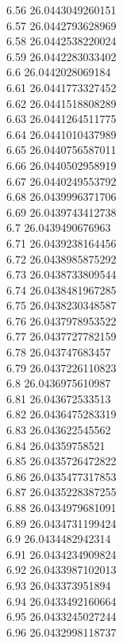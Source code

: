 {6.56	26.0443049260151\\
6.57	26.0442793628969\\
6.58	26.0442538220024\\
6.59	26.0442283033402\\
6.6	26.0442028069184\\
6.61	26.0441773327452\\
6.62	26.0441518808289\\
6.63	26.0441264511775\\
6.64	26.0441010437989\\
6.65	26.0440756587011\\
6.66	26.0440502958919\\
6.67	26.0440249553792\\
6.68	26.0439996371706\\
6.69	26.0439743412738\\
6.7	26.0439490676963\\
6.71	26.0439238164456\\
6.72	26.0438985875292\\
6.73	26.0438733809544\\
6.74	26.0438481967285\\
6.75	26.0438230348587\\
6.76	26.0437978953522\\
6.77	26.0437727782159\\
6.78	26.043747683457\\
6.79	26.0437226110823\\
6.8	26.0436975610987\\
6.81	26.043672533513\\
6.82	26.0436475283319\\
6.83	26.043622545562\\
6.84	26.04359758521\\
6.85	26.0435726472822\\
6.86	26.0435477317853\\
6.87	26.0435228387255\\
6.88	26.0434979681091\\
6.89	26.0434731199424\\
6.9	26.0434482942314\\
6.91	26.0434234909824\\
6.92	26.0433987102013\\
6.93	26.043373951894\\
6.94	26.0433492160664\\
6.95	26.0433245027244\\
6.96	26.0432998118737\\
}
